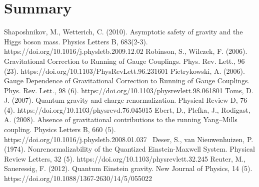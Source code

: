 \documentclass[11pt, a4paper]{article}
\begin{document}
\section*{Summary}

\begin{thebibliography}{9}
    Shaposhnikov, M., Wetterich, C. (2010). Asymptotic safety of gravity and the Higgs boson mass. Physics Letters B, 683(2-3). https://doi.org/10.1016/j.physletb.2009.12.02    
    Robinson, S., Wilczek, F. (2006). Gravitational Correction to Running of Gauge Couplings. Phys. Rev. Lett., 96 (23). https://doi.org/10.1103/PhysRevLett.96.231601
    Pietrykowski, A. (2006). Gauge Dependence of Gravitational Correction to Running of Gauge Couplings. Phys. Rev. Lett., 98 (6). https://doi.org/10.1103/physrevlett.98.061801
    Toms, D. J. (2007). Quantum gravity and charge renormalization. Physical Review D, 76 (4). https://doi.org/10.1103/physrevd.76.045015
    Ebert, D., Plefka, J., Rodigast, A. (2008). Absence of gravitational contributions to the running Yang–Mills coupling. Physics Letters B, 660 (5). https://doi.org/10.1016/j.physletb.2008.01.037 
    Deser, S., van Nieuwenhuizen, P. (1974). Nonrenormalizability of the Quantized Einstein-Maxwell System. Physical Review Letters, 32 (5). https://doi.org/10.1103/physrevlett.32.245
    Reuter, M., Saueressig, F. (2012). Quantum Einstein gravity. New Journal of Physics, 14 (5). https://doi.org/10.1088/1367-2630/14/5/055022
\end{thebibliography}
\end{document}
